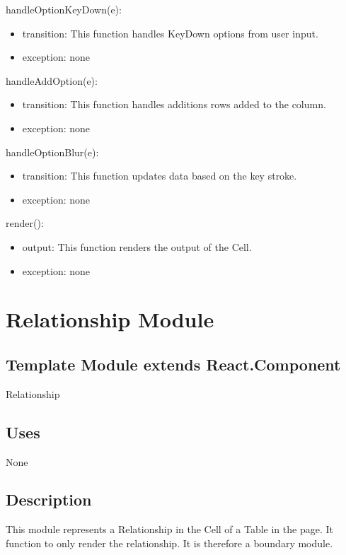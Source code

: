 \documentclass[12pt, titlepage]{article}
\begin{document}
\noindent handleOptionKeyDown(e):
\begin{itemize}
\item transition: This function handles KeyDown options from user input.
\item exception: none
\end{itemize}

\noindent handleAddOption(e):
\begin{itemize}
\item transition: This function handles additions rows added to the column.
\item exception: none
\end{itemize}

\noindent handleOptionBlur(e):
\begin{itemize}
\item transition: This function updates data based on the key stroke.
\item exception: none
\end{itemize}

\noindent render():
\begin{itemize}
\item output: This function renders the output of the Cell.
\item exception: none
\end{itemize}

\newpage

\section{Relationship Module}

\subsection{Template Module extends React.Component}

Relationship

\subsection{Uses}

None

\subsection{Description}
This module represents a Relationship in the Cell of a Table in the page. It function to only render the relationship. It is therefore a boundary module.
\end{document}
